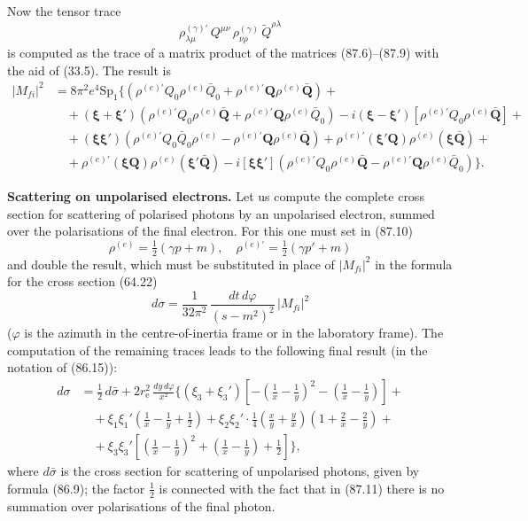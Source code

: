 Now the tensor trace
\[
\rho^{(\gamma)\prime}_{\lambda\mu}\, Q^{\mu\nu}\, \rho^{(\gamma)}_{\nu\rho}\, \widetilde{Q}^{\rho\lambda}
\]
is computed as the trace of a matrix product of the matrices (87.6)--(87.9) with the aid of (33.5). The result is
\begin{equation}
\begin{split}
|M_{fi}|^2 &= 8\pi^2 e^4 \operatorname{Sp_1}\bigl\{(\rho^{(e)\prime}Q_0\rho^{(e)}\bar{Q}_0 + \rho^{(e)\prime}\mathbf{Q}\rho^{(e)}\bar{\mathbf{Q}}) + {} \\
&\quad {} + (\boldsymbol{\xi} + \boldsymbol{\xi}')(\rho^{(e)\prime}Q_0\rho^{(e)}\bar{\mathbf{Q}} + \rho^{(e)\prime}\mathbf{Q}\rho^{(e)}\bar{Q}_0) - i(\boldsymbol{\xi} - \boldsymbol{\xi}')[\rho^{(e)\prime}Q_0\rho^{(e)}\bar{\mathbf{Q}}] + {} \\
&\quad {} + (\boldsymbol{\xi\xi}')(\rho^{(e)\prime}Q_0\bar{Q}_0\rho^{(e)} - \rho^{(e)\prime}\mathbf{Q}\rho^{(e)}\bar{\mathbf{Q}}) + \rho^{(e)\prime}(\boldsymbol{\xi}'\mathbf{Q})\rho^{(e)}(\boldsymbol{\xi}\bar{\mathbf{Q}}) + {} \\
&\quad {} + \rho^{(e)\prime}(\boldsymbol{\xi}\mathbf{Q})\rho^{(e)}(\boldsymbol{\xi}'\bar{\mathbf{Q}}) - i[\boldsymbol{\xi\xi}'](\rho^{(e)\prime}Q_0\rho^{(e)}\bar{\mathbf{Q}} - \rho^{(e)\prime}\mathbf{Q}\rho^{(e)}\bar{Q}_0)\bigr\}.
\end{split}
\label{eq:87.10}
\end{equation}

\textbf{Scattering on unpolarised electrons.} Let us compute the complete cross section for scattering of polarised photons by an unpolarised electron, summed over the polarisations of the final electron. For this one must set in (87.10)
\[
\rho^{(e)} = \tfrac{1}{2}(\gamma p + m), \quad \rho^{(e)\prime} = \tfrac{1}{2}(\gamma p' + m)
\]
and double the result, which must be substituted in place of $|M_{fi}|^2$ in the formula for the cross section (64.22)
\[
d\sigma = \frac{1}{32\pi^2}\,\frac{dt\,d\varphi}{(s - m^2)^2}\,|M_{fi}|^2
\]
($\varphi$ is the azimuth in the centre-of-inertia frame or in the laboratory frame). The computation of the remaining traces leads to the following final result (in the notation of (86.15)):
\begin{equation}
\begin{split}
d\sigma &= \frac{1}{2}\,d\bar{\sigma} + 2r_\mathrm{e}^2\,\frac{dy\,d\varphi}{x^2}\biggl\{(\xi_3 + \xi_3')\left[-\left(\frac{1}{x} - \frac{1}{y}\right)^{\!2} - \left(\frac{1}{x} - \frac{1}{y}\right)\right] + {} \\
&\quad {} + \xi_1\xi_1'\left(\frac{1}{x} - \frac{1}{y} + \frac{1}{2}\right) + \xi_2\xi_2'\cdot\frac{1}{4}\left(\frac{x}{y} + \frac{y}{x}\right)\left(1 + \frac{2}{x} - \frac{2}{y}\right) + {} \\
&\quad {} + \xi_3\xi_3'\left[\left(\frac{1}{x} - \frac{1}{y}\right)^{\!2} + \left(\frac{1}{x} - \frac{1}{y}\right) + \frac{1}{2}\right]\biggr\},
\end{split}
\label{eq:87.11}
\end{equation}
where $d\bar{\sigma}$ is the cross section for scattering of unpolarised photons, given by formula (86.9); the factor $\frac{1}{2}$ is connected with the fact that in (87.11) there is no summation over polarisations of the final photon.

